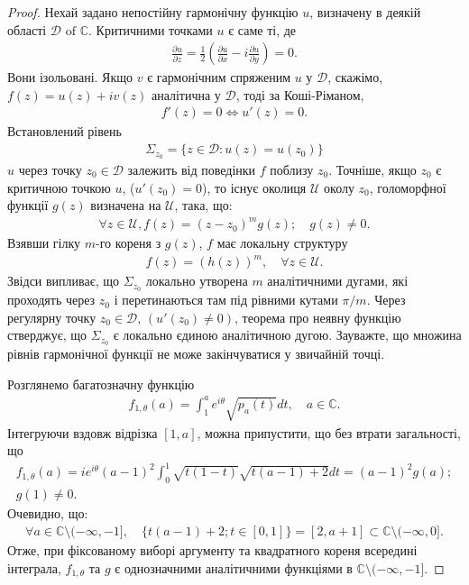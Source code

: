 \documentclass{article}
\begin{document}
\begin{proof}
Нехай задано непостійну гармонічну функцію $ u $, визначену в деякій області $ \mathcal{D} \text{ of } \mathbb{C} $. Критичними точками $ u $ є саме ті, де
\begin{align*}
    \frac{\partial u}{\partial z} = \frac{1}{2} \left( \frac{\partial u}{\partial x} - i \frac{\partial u}{\partial y} \right) = 0.
\end{align*}
Вони ізольовані. Якщо $ v $ є гармонічним спряженим $ u $ у $ \mathcal{D} $, скажімо, $ f (z) = u (z) + iv (z) $ аналітична у $ \mathcal{D} $, тоді за Коші-Ріманом,
\begin{align*}
    f' (z) = 0 \iff u' (z) = 0.
\end{align*}
Встановлений рівень
\begin{align*}
    \Sigma_{z_0} = \{z \in \mathcal{D} : u (z) = u (z_0)\}
\end{align*}
$ u $ через точку $ z_0 \in \mathcal{D} $ залежить від поведінки $ f $ поблизу $ z_0 $. Точніше, якщо $ z_0 $ є критичною точкою $ u $, ($ u'(z_0) = 0 $), то існує околиця $ \mathcal{U} $ околу $ z_0 $, голоморфної функції $ g(z) $ визначена на $ \mathcal{U} $, така, що:
\begin{align*}
    \forall z \in \mathcal{U}, f(z) = (z - z_0)^m g(z); \quad g(z) \neq 0.
\end{align*}
Взявши гілку $ m $-го кореня з $ g(z) $, $ f $ має локальну структуру
\begin{align*}
    f(z) = (h(z))^m, \quad \forall z \in \mathcal{U}.
\end{align*}
Звідси випливає, що $ \Sigma_{z_0} $ локально утворена $ m $ аналітичними дугами, які проходять через $ z_0 $ і перетинаються там під рівними кутами $ \pi/m $. Через регулярну точку $ z_0 \in \mathcal{D} $, $ (u'(z_0) \neq 0) $, теорема про неявну функцію стверджує, що $ \Sigma_{z_0} $ є локально єдиною аналітичною дугою. Зауважте, що множина рівнів гармонічної функції не може закінчуватися у звичайній точці.

Розглянемо багатозначну функцію
\begin{align*}
    f_{1,\theta}(a) = \int_1^a e^{i\theta} \sqrt{p_a(t)} dt, \quad a \in \mathbb{C}.
\end{align*}
Інтегруючи вздовж відрізка $ [1,a] $, можна припустити, що без втрати загальності, що
\begin{multline} \label{eq:multivalued_function_step_1}
    f_{1,\theta}(a) = i e^{i\theta} (a - 1)^2 \int_0^1 \sqrt{t(1-t)} \sqrt{t(a-1) + 2} dt = (a - 1)^2 g(a);\\
    g(1) \neq 0.
\end{multline}
Очевидно, що:
\begin{align*}
    \forall a \in \mathbb{C} \setminus (-\infty, -1], \quad \{t(a - 1) + 2; t \in [0,1]\} = [2, a + 1] \subset \mathbb{C} \setminus (-\infty, 0].
\end{align*}
Отже, при фіксованому виборі аргументу та квадратного кореня всередині інтеграла, $f_{1,\theta}$ та $g$ є однозначними аналітичними функціями в $ \mathbb{C} \setminus (-\infty, -1] $.


\end{proof}
\end{document}
